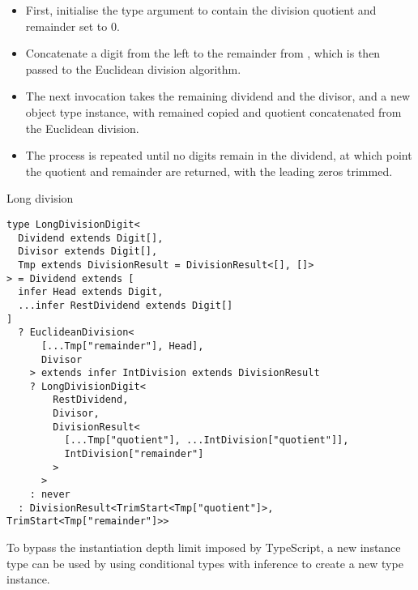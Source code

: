 \begin{itemize}
  \item First, initialise the  type argument to contain the division quotient and remainder set to 0.
  \item Concatenate a digit from the left to the remainder from , which is then passed to the Euclidean division algorithm.
  \item The next  invocation takes the remaining dividend and the divisor, and a new  object type instance, with remained copied and quotient concatenated from the Euclidean division.
  \item The process is repeated until no digits remain in the dividend, at which point the quotient and remainder are returned, with the leading zeros trimmed.
\end{itemize}


\begin{listing}[ht]
\caption{Long division}\label{lst:long-division}
\begin{verbatim}
type LongDivisionDigit<
  Dividend extends Digit[],
  Divisor extends Digit[],
  Tmp extends DivisionResult = DivisionResult<[], []>
> = Dividend extends [
  infer Head extends Digit,
  ...infer RestDividend extends Digit[]
]
  ? EuclideanDivision<
      [...Tmp["remainder"], Head],
      Divisor
    > extends infer IntDivision extends DivisionResult
    ? LongDivisionDigit<
        RestDividend,
        Divisor,
        DivisionResult<
          [...Tmp["quotient"], ...IntDivision["quotient"]],
          IntDivision["remainder"]
        >
      >
    : never
  : DivisionResult<TrimStart<Tmp["quotient"]>, TrimStart<Tmp["remainder"]>>
\end{verbatim}
\end{listing}

To bypass the instantiation depth limit imposed by TypeScript, a new instance type can be used by using conditional types with inference to create a new type instance. 
